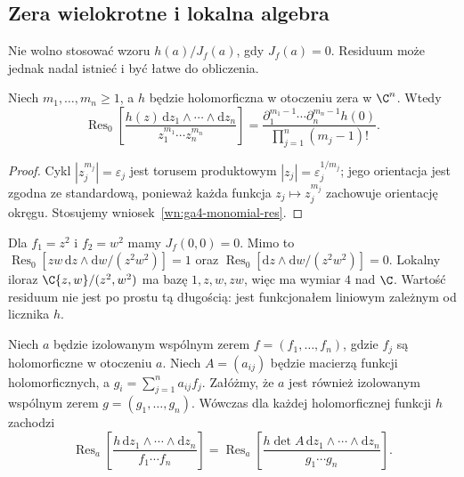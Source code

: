 \subsection{Zera wielokrotne i lokalna algebra}
\label{subsec:ga4-res-multiple}

Nie wolno stosować wzoru $h(a)/J_f(a)$, gdy $J_f(a)=0$.
Residuum może jednak nadal istnieć i być łatwe do obliczenia.

\begin{twierdzenie}
\label{tw:ga4-res-monomial}
Niech $m_1,\ldots,m_n\ge1$, a $h$ będzie holomorficzna
w otoczeniu zera w $\C^n$. Wtedy
\[
\operatorname{Res}_0\!\left[
\frac{h(z)\,\mathrm dz_1\wedge\cdots\wedge\mathrm dz_n}
{z_1^{m_1}\cdots z_n^{m_n}}\right]
=\frac{\partial_1^{m_1-1}\cdots\partial_n^{m_n-1}h(0)}
{\prod_{j=1}^n(m_j-1)!}.
\]
\end{twierdzenie}
\begin{proof}
Cykl $|z_j^{m_j}|=\varepsilon_j$ jest torusem produktowym
$|z_j|=\varepsilon_j^{1/m_j}$; jego orientacja jest
zgodna ze standardową, ponieważ każda funkcja
$z_j\mapsto z_j^{m_j}$ zachowuje orientację okręgu.
Stosujemy wniosek~\ref{wn:ga4-monomial-res}.
\end{proof}

\begin{przyklad}
Dla $f_1=z^2$ i $f_2=w^2$ mamy $J_f(0,0)=0$.
Mimo to $\operatorname{Res}_0[zw\,\mathrm dz\wedge\mathrm dw/
(z^2w^2)]=1$ oraz
$\operatorname{Res}_0[\mathrm dz\wedge\mathrm dw/(z^2w^2)]=0$.
Lokalny iloraz $\C\{z,w\}/(z^2,w^2)$ ma bazę
$1,z,w,zw$, więc ma wymiar $4$ nad $\C$.
Wartość residuum nie jest po prostu tą długością:
jest funkcjonałem liniowym zależnym od licznika $h$.
\end{przyklad}

\begin{twierdzenie}
\label{tw:ga4-res-transform}
Niech $a$ będzie izolowanym wspólnym zerem
$f=(f_1,\ldots,f_n)$, gdzie $f_j$ są holomorficzne
w otoczeniu $a$. Niech $A=(a_{ij})$ będzie macierzą
funkcji holomorficznych, a $g_i=\sum_{j=1}^n a_{ij}f_j$.
Załóżmy, że $a$ jest również izolowanym wspólnym zerem
$g=(g_1,\ldots,g_n)$. Wówczas dla każdej holomorficznej
funkcji $h$ zachodzi
\[
\operatorname{Res}_a\!\left[
\frac{h\,\mathrm dz_1\wedge\cdots\wedge\mathrm dz_n}
{f_1\cdots f_n}\right]
=\operatorname{Res}_a\!\left[
\frac{h\det A\,\mathrm dz_1\wedge\cdots\wedge\mathrm dz_n}
{g_1\cdots g_n}\right].
\]
\end{twierdzenie}

